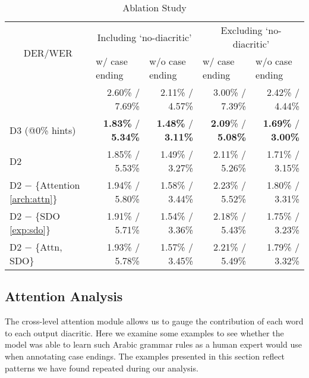 \documentclass[11pt]{article}
\begin{document}
\begin{table}[h]
\centering
\begin{tabular}{|l|r|r|r|r|}
\hline
\multicolumn{1}{|c|}{\multirow{2}{*}{DER/WER}} & \multicolumn{2}{c|}{Including `no-diacritic'}                              & \multicolumn{2}{c|}{Excluding `no-diacritic'}                              \\ \cline{2-5} 
\multicolumn{1}{|c|}{}                         & \multicolumn{1}{l|}{w/ case ending} & \multicolumn{1}{l|}{w/o case ending} & \multicolumn{1}{l|}{w/ case ending} & \multicolumn{1}{l|}{w/o case ending} \\ \hline
\cite{fadel19-neural}                          & 2.60\% / 7.69\%                     & 2.11\% / 4.57\%                      & 3.00\% / 7.39\%                     & 2.42\% / 4.44\%                      \\ \hline
D3 (@0\% hints)                                & \textbf{1.83\%} / \textbf{5.34\%}  & \textbf{1.48\%} / \textbf{3.11\%}  & \textbf{2.09}\%  / \textbf{5.08\%}     & \textbf{1.69\%} / \textbf{3.00\%}    \\ \hline
D2                                             & 1.85\% / 5.53\%                     & 1.49\% / 3.27\%                      & 2.11\% / 5.26\%                     & 1.71\% / 3.15\%                      \\ \hline
D2 $-$ \{Attention \ref{arch:attn}\}           & 1.94\% / 5.80\%                     & 1.58\% / 3.44\%                      & 2.23\% / 5.52\%                     & 1.80\% / 3.31\%                      \\ \hline
D2 $-$ \{SDO \ref{exp:sdo}\}                   & 1.91\% / 5.71\%                     & 1.54\% / 3.36\%                      & 2.18\% / 5.43\%                     & 1.75\% / 3.23\%                      \\ \hline
D2 $-$ \{Attn, SDO\}                           & 1.93\% / 5.78\%                     & 1.57\% / 3.45\%                      & 2.21\% / 5.49\%                     & 1.79\% / 3.32\%                      \\ \hline
\end{tabular}
\caption{Ablation Study}
\label{tab:ablation}
\end{table}

\subsection{Attention Analysis}

The cross-level attention module allows us to gauge the contribution of each word to each output diacritic. Here we examine some examples to see whether the model was able to learn such Arabic grammar rules as a human expert would use when annotating case endings. The examples presented in this section reflect patterns we have found repeated during our analysis.
\end{document}
